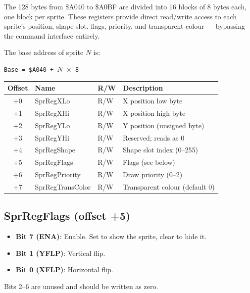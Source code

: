 The 128 bytes from \$A040 to \$A0BF are divided into 16 blocks of 8 bytes
each, one block per sprite.  These registers provide direct read/write access
to each sprite's position, shape slot, flags, priority, and transparent
colour --- bypassing the command interface entirely.

The base address of sprite $N$ is:

\begin{center}
\texttt{Base = \$A040 + $N$ $\times$ 8}
\end{center}

\begin{center}
\small
\begin{tabular}{@{}clll@{}}
\toprule
\textbf{Offset} & \textbf{Name} & \textbf{R/W} & \textbf{Description} \\
\midrule
+0 & SprRegXLo       & R/W & X position low byte \\
+1 & SprRegXHi       & R/W & X position high byte \\
+2 & SprRegYLo       & R/W & Y position (unsigned byte) \\
+3 & SprRegYHi       & R/W & Reserved; reads as 0 \\
+4 & SprRegShape     & R/W & Shape slot index (0--255) \\
+5 & SprRegFlags     & R/W & Flags (see below) \\
+6 & SprRegPriority  & R/W & Draw priority (0--2) \\
+7 & SprRegTransColor & R/W & Transparent colour (default 0) \\
\bottomrule
\end{tabular}
\end{center}

\subsection*{SprRegFlags (offset +5)}


\begin{itemize}
  \item \textbf{Bit 7 (ENA)}: Enable.  Set to show the sprite, clear to hide it.
  \item \textbf{Bit 1 (YFLP)}: Vertical flip.
  \item \textbf{Bit 0 (XFLP)}: Horizontal flip.
\end{itemize}

Bits 2--6 are unused and should be written as zero.

